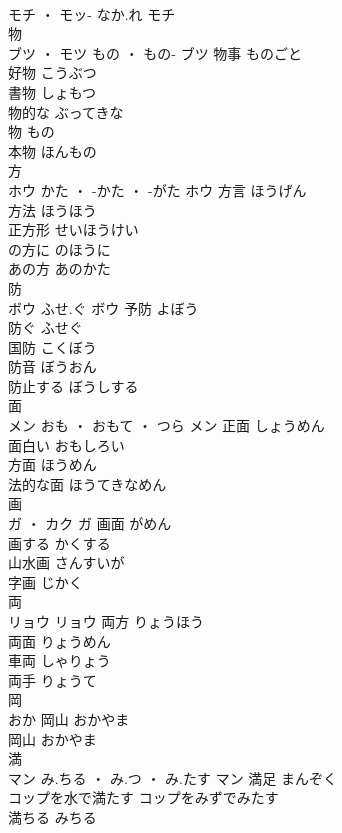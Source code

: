 \documentclass[8pt]{extreport}
\begin{document}
\begin{CJK}{UTF8}{min}
\\	モチ ・ モッ-	なか.れ	モチ																																			
\\	物	
\\	ブツ ・ モツ	もの ・ もの-	ブツ	物事	ものごと	
\\	好物	こうぶつ	
\\	書物	しょもつ	
\\	物的な	ぶってきな	
\\	物	もの	
\\	本物	ほんもの	
\\	方	
\\	ホウ	かた ・ -かた ・ -がた	ホウ	方言	ほうげん	
\\	方法	ほうほう	
\\	正方形	せいほうけい	
\\	の方に	のほうに	
\\	あの方	あのかた	
\\	防	
\\	ボウ	ふせ.ぐ	ボウ	予防	よぼう	
\\	防ぐ	ふせぐ	
\\	国防	こくぼう	
\\	防音	ぼうおん	
\\	防止する	ぼうしする	
\\	面	
\\	メン	おも ・ おもて ・ つら	メン	正面	しょうめん	
\\	面白い	おもしろい	
\\	方面	ほうめん	
\\	法的な面	ほうてきなめん	
\\	画	
\\	ガ ・ カク		ガ	画面	がめん	
\\	画する	かくする	
\\	山水画	さんすいが	
\\	字画	じかく	
\\	両	
\\	リョウ		リョウ	両方	りょうほう	
\\	両面	りょうめん	
\\	車両	しゃりょう	
\\	両手	りょうて	
\\	岡	
\\	おか		岡山	おかやま	
\\	岡山	おかやま	
\\	満	
\\	マン	み.ちる ・ み.つ ・ み.たす	マン	満足	まんぞく	
\\	コップを水で満たす	コップをみずでみたす	
\\	満ちる	みちる	

\end{CJK}
\end{document}
